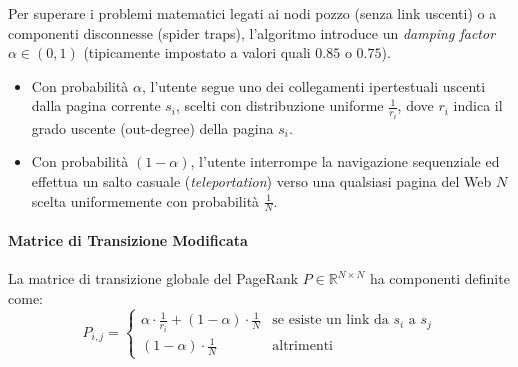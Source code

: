 Per superare i problemi matematici legati ai nodi pozzo (senza link uscenti) o a componenti disconnesse (spider traps), l'algoritmo introduce un \emph{damping factor} $\alpha \in (0, 1)$ (tipicamente impostato a valori quali $0.85$ o $0.75$).
\begin{itemize}
    \item Con probabilità $\alpha$, l'utente segue uno dei collegamenti ipertestuali uscenti dalla pagina corrente $s_i$, scelti con distribuzione uniforme $\frac{1}{r_i}$, dove $r_i$ indica il grado uscente (out-degree) della pagina $s_i$.
    \item Con probabilità $(1 - \alpha)$, l'utente interrompe la navigazione sequenziale ed effettua un salto casuale (\emph{teleportation}) verso una qualsiasi pagina del Web $N$ scelta uniformemente con probabilità $\frac{1}{N}$.
\end{itemize}

\paragraph{Matrice di Transizione Modificata}
La matrice di transizione globale del PageRank $P \in \mathbb{R}^{N \times N}$ ha componenti definite come:
\begin{equation*}
P_{i,j} = \begin{cases}
\alpha \cdot \frac{1}{r_i} + (1 - \alpha) \cdot \frac{1}{N} & \text{se esiste un link da } s_i \text{ a } s_j \\[8pt]
(1 - \alpha) \cdot \frac{1}{N} & \text{altrimenti}
\end{cases}
\end{equation*}

